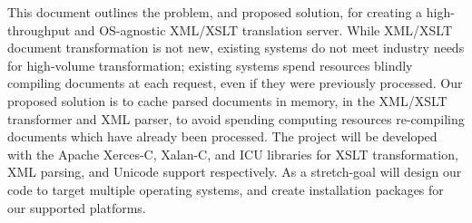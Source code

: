 This document outlines the problem, and proposed solution, for creating a high-throughput and OS-agnostic XML/XSLT translation server. 
While XML/XSLT document transformation is not new, existing systems do not meet industry needs for high-volume transformation; existing systems spend resources blindly compiling documents at each request, even if they were previously processed.
Our proposed solution is to cache parsed documents in memory, in the XML/XSLT transformer and XML parser, to avoid spending computing resources re-compiling documents which have already been processed.
The project will be developed with the Apache Xerces-C, Xalan-C, and ICU libraries for XSLT transformation, XML parsing, and Unicode support respectively.
As a stretch-goal will design our code to target multiple operating systems, and create installation packages for our supported platforms.
